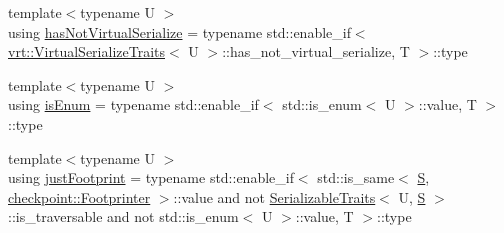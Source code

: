 \begin{DoxyCompactItemize}
\item 
{\footnotesize template$<$typename U $>$ }\\using \hyperlink{structcheckpoint_1_1dispatch_1_1_serializer_dispatch_non_byte_aa9c0d5e9e139a9d922b1ce4adf339465}{has\+Not\+Virtual\+Serialize} = typename std\+::enable\+\_\+if$<$ \hyperlink{structcheckpoint_1_1dispatch_1_1vrt_1_1_virtual_serialize_traits}{vrt\+::\+Virtual\+Serialize\+Traits}$<$ U $>$\+::has\+\_\+not\+\_\+virtual\+\_\+serialize, T $>$\+::type
\item 
{\footnotesize template$<$typename U $>$ }\\using \hyperlink{structcheckpoint_1_1dispatch_1_1_serializer_dispatch_non_byte_ac47ded9971a3ed3d8d1824d1ff12031a}{is\+Enum} = typename std\+::enable\+\_\+if$<$ std\+::is\+\_\+enum$<$ U $>$\+::value, T $>$\+::type
\item 
{\footnotesize template$<$typename U $>$ }\\using \hyperlink{structcheckpoint_1_1dispatch_1_1_serializer_dispatch_non_byte_a162005f14e0a0cf2f3df64c2d9ec4d9e}{just\+Footprint} = typename std\+::enable\+\_\+if$<$ std\+::is\+\_\+same$<$ \hyperlink{structcheckpoint_1_1dispatch_1_1_serializer_dispatch_non_byte_a456d0c02fc35667989d79ddbb0393776}{S}, \hyperlink{structcheckpoint_1_1_footprinter}{checkpoint\+::\+Footprinter} $>$\+::value and not \hyperlink{structcheckpoint_1_1_serializable_traits}{Serializable\+Traits}$<$ U, \hyperlink{structcheckpoint_1_1dispatch_1_1_serializer_dispatch_non_byte_a456d0c02fc35667989d79ddbb0393776}{S} $>$\+::is\+\_\+traversable and not std\+::is\+\_\+enum$<$ U $>$\+::value, T $>$\+::type
\end{DoxyCompactItemize}
